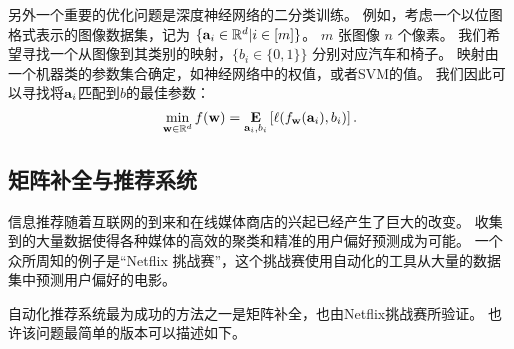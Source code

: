 另外一个重要的优化问题是深度神经网络的二分类训练。
例如，考虑一个以位图格式表示的图像数据集，记为 $\{ \mathbf{a}_i \in {\mathbb R}^{d}  | i \in [m]\}$。
$m$ 张图像 $n$ 个像素。
我们希望寻找一个从图像到其类别的映射，$\{b_i \in \{0,1\} \}$ 分别对应汽车和椅子。
映射由一个机器类的参数集合确定，如神经网络中的权值，或者SVM的值。
我们因此可以寻找将$\mathbf{a}_i$匹配到$b$的最佳参数：
$$ \min_{\mathbf{w} \in {\mathbb R}^d} f(\mathbf{w}) =  \mathop{\mbox{\bf E}}_{ \mathbf{a}_i , b_i } \left[ \ell( f_{\mathbf{w}} (\mathbf{a}_i) , b_ i ) \right]  . $$ 




\subsection{
    矩阵补全与推荐系统
    }


信息推荐随着互联网的到来和在线媒体商店的兴起已经产生了巨大的改变。
收集到的大量数据使得各种媒体的高效的聚类和精准的用户偏好预测成为可能。
一个众所周知的例子是“Netflix 挑战赛”，这个挑战赛使用自动化的工具从大量的数据集中预测用户偏好的电影。

自动化推荐系统最为成功的方法之一是矩阵补全，也由Netflix挑战赛所验证。
也许该问题最简单的版本可以描述如下。

